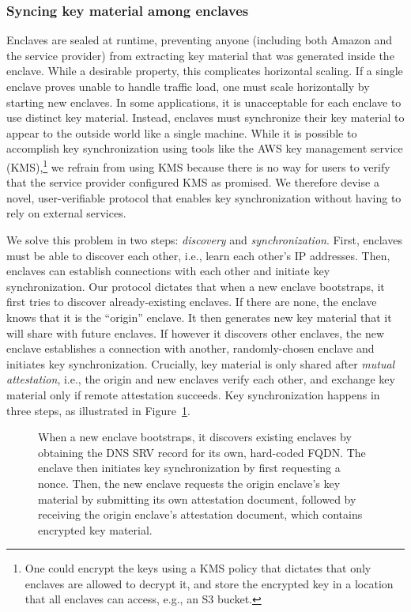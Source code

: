 \subsubsection{Syncing key material among enclaves}
\label{sec:sync}

Enclaves are sealed at runtime, preventing anyone (including both Amazon and the
service provider) from extracting key material that was generated inside the
enclave.  While a desirable property, this complicates horizontal scaling.  If a
single enclave proves unable to handle traffic load, one must scale horizontally
by starting new enclaves.  In some applications, it is unacceptable for each
enclave to use distinct key material.  Instead, enclaves must synchronize their
key material to appear to the outside world like a single machine.  While it is
possible to accomplish key synchronization using tools like the AWS key
management service (KMS),\footnote{One could encrypt the keys using a KMS policy
that dictates that only enclaves are allowed to decrypt it, and store the
encrypted key in a location that all enclaves can access, e.g., an S3 bucket.}
we refrain from using KMS because there is no way for users to verify that the
service provider configured KMS as promised.  We therefore devise a novel,
user-verifiable protocol that enables key synchronization without having to rely
on external services.

We solve this problem in two steps: \emph{discovery} and \emph{synchronization}.
First, enclaves must be able to discover each other, i.e., learn each other's IP
addresses.  Then, enclaves can establish connections with each other and
initiate key synchronization.  Our protocol dictates that when a new enclave
bootstraps, it first tries to discover already-existing enclaves.  If there are
none, the enclave knows that it is the ``origin'' enclave.  It then generates
new key material that it will share with future enclaves.  If however it
discovers other enclaves, the new enclave establishes a connection with another,
randomly-chosen enclave and initiates key synchronization.  Crucially, key
material is only shared after \emph{mutual attestation}, i.e., the origin and
new enclaves verify each other, and exchange key material only if remote
attestation succeeds.  Key synchronization happens in three steps, as
illustrated in Figure~\ref{fig:key-synchronization}.

\begin{figure}[t]
  \centering
  
  \caption{When a new enclave bootstraps, it discovers existing enclaves by
    obtaining the DNS SRV record for its own, hard-coded FQDN.  The enclave then
    initiates key synchronization by first requesting a nonce.  Then, the new
    enclave requests the origin enclave's key material by submitting its own
    attestation document, followed by receiving the origin enclave's attestation
    document, which contains encrypted key material.}
  \label{fig:key-synchronization}
\end{figure}

